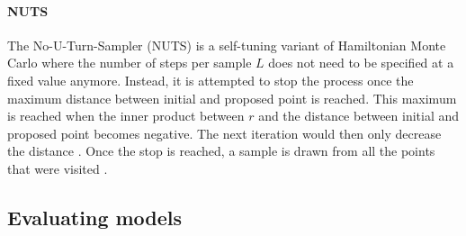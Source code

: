 \documentclass{article}
\begin{document}


\paragraph{NUTS}
The No-U-Turn-Sampler (NUTS) is a self-tuning variant of Hamiltonian Monte Carlo where the number of steps per sample $L$ does not need to be specified at a fixed value anymore. Instead,
it is attempted to stop the process once the maximum distance between initial and proposed point is reached. This maximum is reached when the inner product between $r$ and the distance between initial and proposed point becomes negative. The next iteration would then only decrease the distance  \cite{1439840954}.
Once the stop is reached, a sample is drawn from all the points that were visited \cite{hoffman2014no}.


\subsection{Evaluating models}
\end{document}
